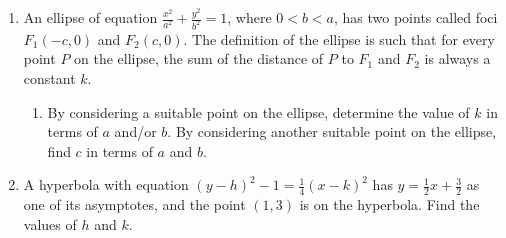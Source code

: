 \begin{problem}[\chili]
    \begin{enumerate}
        \item An ellipse of equation $\frac{x^{2}}{a^{2}}+\frac{y^{2}}{b^{2}}=1$, where $0<b<a$, has two points called foci $F_1(-c, 0)$ and $F_2(c, 0)$. The definition of the ellipse is such that for every point $P$ on the ellipse, the sum of the distance of $P$ to $F_1$ and $F_2$ is always a constant $k$.
        \begin{enumerate}
            \item By considering a suitable point on the ellipse, determine the value of $k$ in terms of $a$ and/or $b$. 
            By considering another suitable point on the ellipse, find $c$ in terms of $a$ and $b$.
        \end{enumerate}
        \item A hyperbola with equation $(y-h)^2 - 1 =\frac14(x-k)^2$ has $y=\frac12 x+\frac32$ as one of its asymptotes, and the point $(1,3)$ is on the hyperbola. Find the values of $h$ and $k$.
    \end{enumerate}
\end{problem}